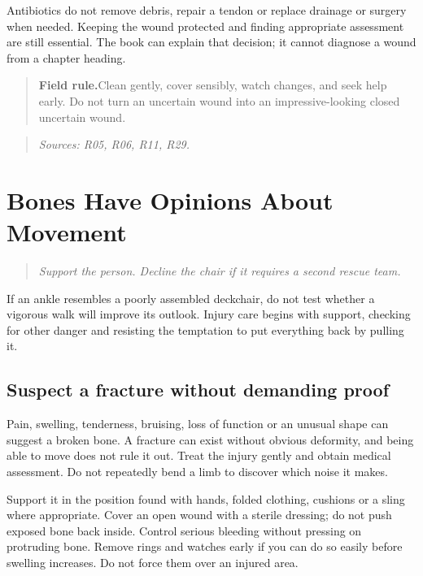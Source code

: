 \documentclass[10pt,openright]{book}
\newcommand{\fieldrule}[1]{\begin{quote}\textbf{Field rule.}\enspace #1\end{quote}}
\begin{document}
Antibiotics do not remove debris, repair a tendon or replace drainage or surgery when needed. Keeping the wound protected and finding appropriate assessment are still essential. The book can explain that decision; it cannot diagnose a wound from a chapter heading.

\fieldrule{Clean gently, cover sensibly, watch changes, and seek help early. Do not turn an uncertain wound into an impressive-looking closed uncertain wound.}
\begin{quote}\emph{Sources: R05, R06, R11, R29.}\end{quote}

\chapter{Bones Have Opinions About Movement}
\begin{quote}\emph{Support the person. Decline the chair if it requires a second rescue team.}\end{quote}
If an ankle resembles a poorly assembled deckchair, do not test whether a vigorous walk will improve its outlook. Injury care begins with support, checking for other danger and resisting the temptation to put everything back by pulling it.

\section*{Suspect a fracture without demanding proof}
Pain, swelling, tenderness, bruising, loss of function or an unusual shape can suggest a broken bone. A fracture can exist without obvious deformity, and being able to move does not rule it out. Treat the injury gently and obtain medical assessment. Do not repeatedly bend a limb to discover which noise it makes.

Support it in the position found with hands, folded clothing, cushions or a sling where appropriate. Cover an open wound with a sterile dressing; do not push exposed bone back inside. Control serious bleeding without pressing on protruding bone. Remove rings and watches early if you can do so easily before swelling increases. Do not force them over an injured area.
\end{document}
